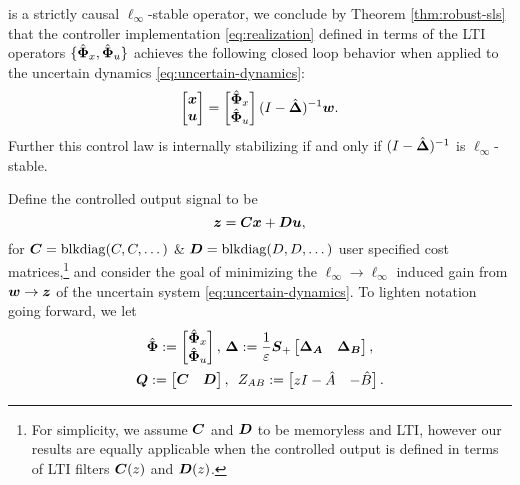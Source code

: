 is a strictly causal $\ell_\infty$-stable operator, we conclude by Theorem \ref{thm:robust-sls} that the controller implementation \eqref{eq:realization} defined in terms of the LTI operators $\{\hat{\boldsymbol{\Phi}}_x,\hat{\boldsymbol{\Phi}}_u\}$ achieves the following closed loop behavior when applied to the uncertain dynamics \eqref{eq:uncertain-dynamics}:
\begin{equation}
\begin{bmatrix}\boldsymbol{x} \\ \boldsymbol{u} \end{bmatrix} = \begin{bmatrix} \hat{\boldsymbol{\Phi}}_x \\ \hat{\boldsymbol{\Phi}}_u \end{bmatrix}(I-\hat{\boldsymbol{\Delta}})^{-1}\boldsymbol{w}.
\label{eq:dhat-response}
\end{equation}
Further this control law is internally stabilizing if and only if $(I-\hat{\boldsymbol{\Delta}})^{-1}$ is $\ell_\infty$-stable.  

Define the controlled output signal to be 
\begin{equation}
\boldsymbol{z} = \boldsymbol{C}\boldsymbol{x} + \boldsymbol{D}\boldsymbol{u},
\label{eq:z-output}
\end{equation}
for $\boldsymbol{C} = \mathrm{blkdiag}(C,C,\dots)$ \& $\boldsymbol{D} = \mathrm{blkdiag}(D,D,\dots)$ user specified cost matrices,\footnote{For simplicity, we assume $\boldsymbol{C}$ and $\boldsymbol{D}$ to be memoryless and LTI, however our results are equally applicable when the controlled output is defined in terms of LTI  filters $\boldsymbol{C}(z)$ and $\boldsymbol{D}(z)$.} and consider the goal of minimizing the $\ell_\infty\to\ell_\infty$ induced gain from $\boldsymbol{w} \to \boldsymbol{z}$ of the uncertain system \eqref{eq:uncertain-dynamics}.  To lighten notation going forward, we let
\begin{multline}
 \hat{\boldsymbol{\Phi}} := \begin{bmatrix}\hat{\boldsymbol{\Phi}}_x \\ \hat{\boldsymbol{\Phi}}_u \end{bmatrix}, \, {\boldsymbol{\Delta}} := \frac{1}{\varepsilon}\boldsymbol{S}_+\begin{bmatrix} {\boldsymbol{\Delta}}_{\boldsymbol{A}} & {\boldsymbol{\Delta}}_{\boldsymbol{B}} \end{bmatrix},\\ \boldsymbol{Q} := \begin{bmatrix} \boldsymbol{C} & \boldsymbol{D} \end{bmatrix}, \, \ Z_{AB} := \begin{bmatrix} zI-\hat A & - \hat B\end{bmatrix}.
\label{eq:notation}
\end{multline}

